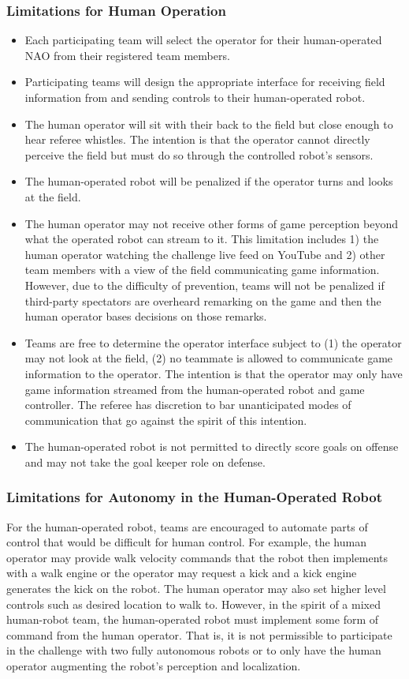 \subsubsection{Limitations for Human Operation}
\begin{itemize}
	\item Each participating team will select the operator for their human-operated NAO from their registered team members.
	\item Participating teams will design the appropriate interface for receiving field information from and sending controls to their human-operated robot.
	\item The human operator will sit with their back to the field but close enough to hear referee whistles. The intention is that the operator cannot directly perceive the field but must do so through the controlled robot’s sensors.
	\item The human-operated robot will be penalized if the operator turns and looks at the field.
	\item The human operator may not receive other forms of game perception beyond what the operated robot can stream to it. This limitation includes 1) the human operator watching the challenge live feed on YouTube and 2) other team members with a view of the field communicating game information. However, due to the difficulty of prevention, teams will not be penalized if third-party spectators are overheard remarking on the game and then the human operator bases decisions on those remarks.
	\item Teams are free to determine the operator interface subject to (1) the operator may not look at the field, (2) no teammate  is allowed to communicate game information to the operator. The intention is that the operator may only have game information streamed from the human-operated robot and game controller. The referee has discretion to bar unanticipated modes of communication that go against the spirit of this intention. 
	\item The human-operated robot is not permitted to directly score goals on offense and may not take the goal keeper role on defense.
\end{itemize}

\subsubsection{Limitations for Autonomy in the Human-Operated Robot}

For the human-operated robot, teams are encouraged to automate parts of control that would be difficult for human control. For example, the human operator may provide walk velocity commands that the robot then implements with a walk engine or the operator may request a kick and a kick engine generates the kick on the robot. The human operator may also set higher level controls such as desired location to walk to. However, in the spirit of a mixed human-robot team, the human-operated robot must implement some form of command from the human operator. That is, it is not permissible to participate in the challenge with two fully autonomous robots or to only have the human operator augmenting the robot's perception and localization. 

